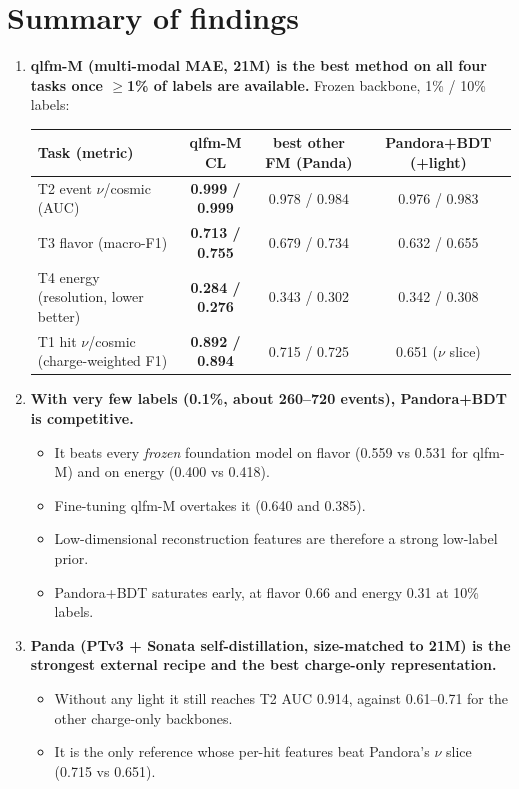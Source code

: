 \documentclass[11pt,a4paper]{article}
\newcommand{\best}[1]{\textbf{#1}}
\begin{document}
\section{Summary of findings}
\begin{enumerate}[leftmargin=*]
\item \textbf{qlfm-M (multi-modal MAE, 21M) is the best method on all four tasks once $\geq$1\% of labels are available.} Frozen backbone, 1\% / 10\% labels:

\begin{center}\footnotesize
\begin{tabular}{lccc}
\toprule
Task (metric) & qlfm-M CL & best other FM (Panda) & Pandora+BDT (+light)\\
\midrule
T2 event $\nu$/cosmic (AUC) & \best{0.999 / 0.999} & 0.978 / 0.984 & 0.976 / 0.983\\
T3 flavor (macro-F1) & \best{0.713 / 0.755} & 0.679 / 0.734 & 0.632 / 0.655\\
T4 energy (resolution, lower better) & \best{0.284 / 0.276} & 0.343 / 0.302 & 0.342 / 0.308\\
T1 hit $\nu$/cosmic (charge-weighted F1) & \best{0.892 / 0.894} & 0.715 / 0.725 & 0.651 ($\nu$ slice)\\
\bottomrule
\end{tabular}
\end{center}

\item \textbf{With very few labels (0.1\%, about 260--720 events), Pandora+BDT is competitive.}
  \begin{itemize}
    \item It beats every \emph{frozen} foundation model on flavor (0.559 vs 0.531 for qlfm-M) and on energy (0.400 vs 0.418).
    \item Fine-tuning qlfm-M overtakes it (0.640 and 0.385).
    \item Low-dimensional reconstruction features are therefore a strong low-label prior.
    \item Pandora+BDT saturates early, at flavor 0.66 and energy 0.31 at 10\% labels.
  \end{itemize}

\item \textbf{Panda (PTv3 + Sonata self-distillation, size-matched to 21M) is the strongest external recipe and the best charge-only representation.}
  \begin{itemize}
    \item Without any light it still reaches T2 AUC 0.914, against 0.61--0.71 for the other charge-only backbones.
    \item It is the only reference whose per-hit features beat Pandora's $\nu$ slice (0.715 vs 0.651).
  \end{itemize}


\end{enumerate}
\end{document}
